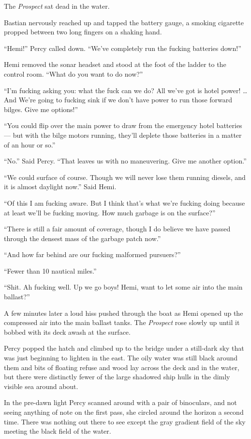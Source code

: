 \documentclass[]{scrbook}
\begin{document}
The \emph{Prospect} sat dead in the water.

Bastian nervously reached up and tapped the battery gauge, a smoking
cigarette propped between two long fingers on a shaking hand.

``Hemi!'' Percy called down. ``We've completely run the fucking
batteries down!''

Hemi removed the sonar headset and stood at the foot of the ladder to
the control room. ``What do you want to do now?''

``I'm fucking asking you: what the fuck can we do? All we've got is
hotel power! \ldots{}And We're going to fucking sink if we don't have
power to run those forward bilges. Give me options!''

``You could flip over the main power to draw from the emergency hotel
batteries --- but with the bilge motors running, they'll deplete those
batteries in a matter of an hour or so.''

``No.'' Said Percy. ``That leaves us with no maneuvering. Give me
another option.''

``We could surface of course. Though we will never lose them running
diesels, and it is almost daylight now.'' Said Hemi.

``Of this I am fucking aware. But I think that's what we're fucking
doing because at least we'll be fucking moving. How much garbage is on
the surface?''

``There is still a fair amount of coverage, though I do believe we have
passed through the densest mass of the garbage patch now.''

``And how far behind are our fucking malformed pursuers?''

``Fewer than 10 nautical miles.''

``Shit. Ah fucking well. Up we go boys! Hemi, want to let some air into
the main ballast?''

A few minutes later a loud hiss pushed through the boat as Hemi opened
up the compressed air into the main ballast tanks. The \emph{Prospect}
rose slowly up until it bobbed with its deck awash at the surface.

Percy popped the hatch and climbed up to the bridge under a still-dark
sky that was just beginning to lighten in the east. The oily water was
still black around them and bits of floating refuse and wood lay across
the deck and in the water, but there were distinctly fewer of the large
shadowed ship hulls in the dimly visible sea around about.

In the pre-dawn light Percy scanned around with a pair of binoculars,
and not seeing anything of note on the first pass, she circled around
the horizon a second time. There was nothing out there to see except the
gray gradient field of the sky meeting the black field of the water.
\end{document}
